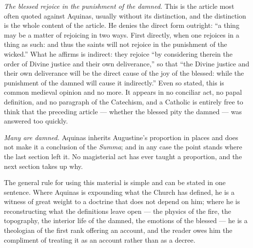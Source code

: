 \emph{The blessed rejoice in the punishment of the damned.} This is the article most often quoted against Aquinas, usually without its distinction, and the distinction is the whole content of the article. He denies the direct form outright: ``a thing may be a matter of rejoicing in two ways. First directly, when one rejoices in a thing as such: and thus the saints will not rejoice in the punishment of the wicked.'' What he affirms is indirect: they rejoice ``by considering therein the order of Divine justice and their own deliverance,'' so that ``the Divine justice and their own deliverance will be the direct cause of the joy of the blessed: while the punishment of the damned will cause it indirectly.'' Even so stated, this is common medieval opinion and no more. It appears in no conciliar act, no papal definition, and no paragraph of the Catechism, and a Catholic is entirely free to think that the preceding article --- whether the blessed pity the damned --- was answered too quickly.

\emph{Many are damned.} Aquinas inherits Augustine's proportion in places and does not make it a conclusion of the \emph{Summa}; and in any case the point stands where the last section left it. No magisterial act has ever taught a proportion, and the next section takes up why.

The general rule for using this material is simple and can be stated in one sentence. Where Aquinas is expounding what the Church has defined, he is a witness of great weight to a doctrine that does not depend on him; where he is reconstructing what the definitions leave open --- the physics of the fire, the topography, the interior life of the damned, the emotions of the blessed --- he is a theologian of the first rank offering an account, and the reader owes him the compliment of treating it as an account rather than as a decree.
